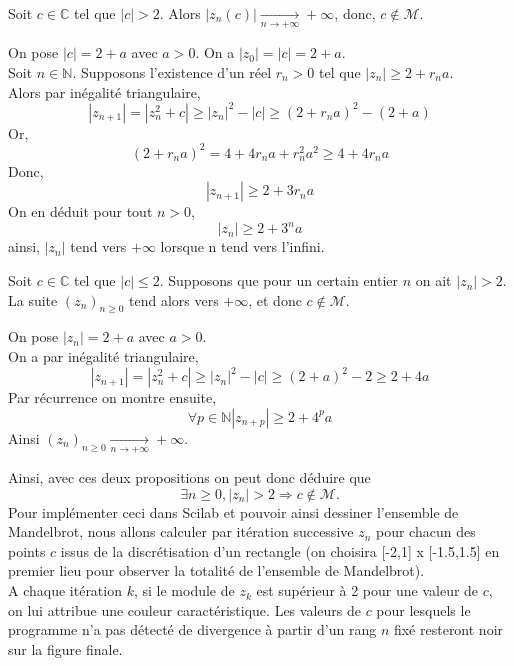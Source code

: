          \begin{proposition}
            Soit $c \in \mathbb{C}$ tel que $|c| > 2$. Alors $|z_n(c)|\underset{n\to +\infty}{\longrightarrow}+\infty$, donc, $c\notin \mathcal{M}$.
         \end{proposition}
         \begin{preuve}
            On pose $|c| = 2+a$ avec $a>0$. On a $|z_0|=|c|=2+a$. \\Soit $n \in \mathbb{N}$. Supposons l'existence d'un réel $r_n > 0$ tel que $|z_n| \geq 2+r_n a$.
            \\Alors par inégalité triangulaire, 
            $$|z_{n+1}|=|z_n^2+c|\geq |z_n|^2-|c|\geq (2+r_n a)^2-(2+a)$$
            Or,
            $$(2+r_n a)^2 = 4 + 4 r_n a+r_n^2 a^2 \geq 4+4 r_n a$$
            Donc,
            $$|z_{n+1}| \geq  2+3 r_n a$$
            On en déduit pour tout $n>0$,
            $$|z_n|\geq 2+3^n a$$
            ainsi, $|z_n|$ tend vers $+\infty$ lorsque n tend vers l'infini.
         \end{preuve}
         \begin{proposition}
            Soit $c \in \mathbb{C}$ tel que $|c| \leq 2$. Supposons que pour un certain entier $n$ on ait $|z_n| > 2$. La suite $(z_n)_{n\geq 0}$ tend alors vers $+\infty$, et donc $c\notin \mathcal{M}$.
         \end{proposition}
         \begin{preuve}
            On pose $|z_n|=2+a$ avec $a>0$.\\On a par inégalité triangulaire,
            $$|z_{n+1}|=|z_n^2+c|\geq |z_n|^2-|c|\geq(2+a)^2-2\geq2+4a$$
            Par récurrence on montre ensuite, 
            $$\forall p \in \mathbb{N}|z_{n+p}|\geq 2+4^p a$$
            Ainsi $(z_n)_{n\geq 0}\underset{n\to +\infty}{\longrightarrow}+\infty$.
         \end{preuve}
         Ainsi, avec ces deux propositions on peut donc déduire que $$\exists n \geq 0, |z_n| > 2 \Rightarrow c \notin \mathcal{M}.$$ 
         Pour implémenter ceci dans Scilab et pouvoir ainsi dessiner l'ensemble de Mandelbrot, nous allons calculer par itération successive $z_n$ pour chacun des points $c$ issus de la discrétisation d'un rectangle (on choisira [-2,1] x [-1.5,1.5] en premier lieu pour observer la totalité de l'ensemble de Mandelbrot).\\ A chaque itération $k$, si le module de $z_k$ est supérieur à 2 pour une valeur de $c$, on lui attribue une couleur caractéristique. Les valeurs de $c$ pour lesquels le programme n'a pas détecté de divergence à partir d'un rang $n$ fixé resteront noir sur la figure finale.
